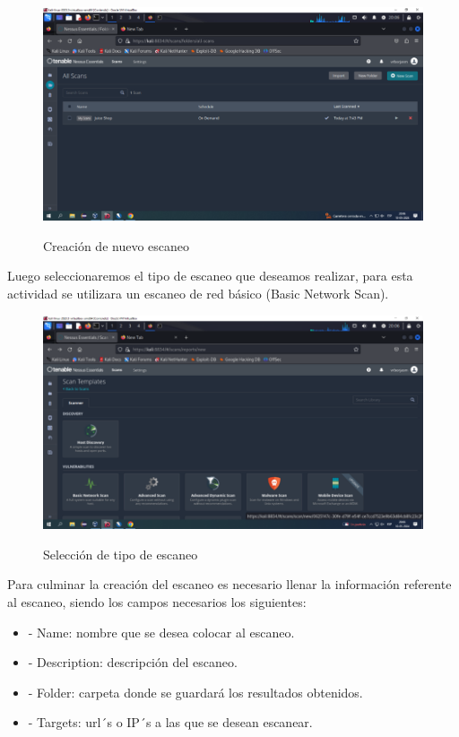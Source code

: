 \documentclass[stu, 11pt, letterpaper, donotrepeattitle, floatsintext, natbib]{apa7}
\begin{document}
\begin{figure}[H]
    \centering
    \caption{Creación de nuevo escaneo}
    \includegraphics[width=0.75\linewidth]{Imagen4.png} %
    \label{fig:OverallEffect}
\end{figure}

Luego seleccionaremos el tipo de escaneo que deseamos realizar, para esta actividad se utilizara un escaneo de red básico (Basic Network Scan).

\begin{figure}[H]
    \centering
    \caption{Selección de tipo de escaneo}
    \includegraphics[width=0.75\linewidth]{Imagen5.png} %
    \label{fig:OverallEffect}
\end{figure}

Para culminar la creación del escaneo es necesario llenar la información referente al escaneo, siendo los campos necesarios los siguientes:

\begin{itemize}
  \item[] - Name: nombre que se desea colocar al escaneo.
  \item[] - Description: descripción del escaneo.
\item[] - Folder: carpeta donde se guardará los resultados obtenidos.
\item[] - Targets: url´s o IP´s a las que se desean escanear.
\end{itemize}
\end{document}
